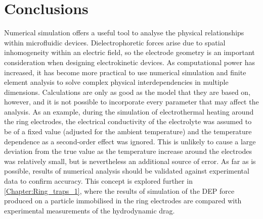 \section{Conclusions}

Numerical simulation offers a useful tool to analyse the physical relationships within microfluidic devices. Dielectrophoretic forces arise due to spatial inhomogeneity within an electric field, so the electrode geometry is an important consideration when designing electrokinetic devices. As computational power has increased, it has become more practical to use numerical simulation and finite element analysis to solve complex physical interdependencies in multiple dimensions. Calculations are only as good as the model that they are based on, however, and it is not possible to incorporate every parameter that may affect the analysis. As an example, during the simulation of electrothermal heating around the ring electrodes, the electrical conductivity of the electrolyte was assumed to be of a fixed value (adjusted for the ambient temperature) and the temperature dependence as a second-order effect was ignored. This is unlikely to cause a large deviation from the true value as the temperature increase around the electrodes was relatively small, but is nevertheless an additional source of error. As far as is possible, results of numerical analysis should be validated against experimental data to confirm accuracy. This concept is explored further in \cref{Chapter:Ring_traps_1}, where the results of simulation of the DEP force produced on a particle immobilised in the ring electrodes are compared with experimental measurements of the hydrodynamic drag.

